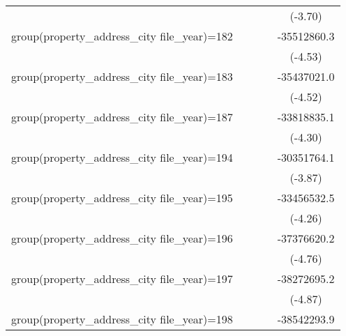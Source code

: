 {\begin{tabular}{l*{4}{c}}
                    &                     &                     &                     &     (-3.70)         \\
\addlinespace
group(property\_address\_city file\_year)=182&                     &                     &                     & -35512860.3\sym{***}\\
                    &                     &                     &                     &     (-4.53)         \\
\addlinespace
group(property\_address\_city file\_year)=183&                     &                     &                     & -35437021.0\sym{***}\\
                    &                     &                     &                     &     (-4.52)         \\
\addlinespace
group(property\_address\_city file\_year)=187&                     &                     &                     & -33818835.1\sym{***}\\
                    &                     &                     &                     &     (-4.30)         \\
\addlinespace
group(property\_address\_city file\_year)=194&                     &                     &                     & -30351764.1\sym{***}\\
                    &                     &                     &                     &     (-3.87)         \\
\addlinespace
group(property\_address\_city file\_year)=195&                     &                     &                     & -33456532.5\sym{***}\\
                    &                     &                     &                     &     (-4.26)         \\
\addlinespace
group(property\_address\_city file\_year)=196&                     &                     &                     & -37376620.2\sym{***}\\
                    &                     &                     &                     &     (-4.76)         \\
\addlinespace
group(property\_address\_city file\_year)=197&                     &                     &                     & -38272695.2\sym{***}\\
                    &                     &                     &                     &     (-4.87)         \\
\addlinespace
group(property\_address\_city file\_year)=198&                     &                     &                     & -38542293.9\sym{***}\\

\end{tabular}}
